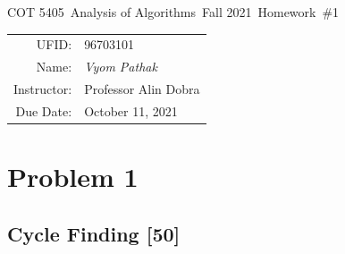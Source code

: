 \documentclass{article}
\newcommand{\hmwkTitle}{Homework\ \#1}
\newcommand{\hmwkDueDate}{October 11, 2021}
\newcommand{\hmwkClassCode}{COT 5405}
\newcommand{\hmwkClass}{Analysis of Algorithms}
\newcommand{\hmwkClassYear}{Fall 2021}
\newcommand{\hmwkClassInstructor}{Professor Alin Dobra}
\newcommand{\hmwkAuthorName}{\textit{Vyom Pathak}}
\newcommand{\hmwkUFID}{96703101}
\begin{document}
\begin{center}
{\Large \hmwkClassCode\ \hmwkClass\ \hmwkClassYear\ \hmwkTitle}

\begin{tabular}{rl}
UFID: & \hmwkUFID \\
Name: & \hmwkAuthorName \\
Instructor: & \hmwkClassInstructor \\
Due Date: & \hmwkDueDate \\ 
\end{tabular}
\end{center}

\section*{Problem 1}
\subsection*{Cycle Finding [50]}
\end{document}
